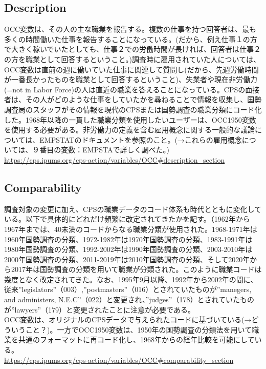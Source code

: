 \documentclass{jsarticle}
\begin{document}
\subsection{Description}
OCC変数は、その人の主な職業を報告する。複数の仕事を持つ回答者は、最も多くの時間働いた仕事を報告することになっている。(だから、例え仕事１の方で大きく稼いでいたとしても、仕事２での労働時間が長ければ、回答者は仕事２の方を職業として回答するということ。)調査時に雇用されていた人については、OCC変数は直前の週に働いていた仕事に関連して質問し(だから、先週労働時間が一番長かったものを職業として回答するということ)、失業者や現在非労働力(=not in Labor Force)の人は直近の職業を答えることになっている。CPSの面接者は、その人がどのような仕事をしていたかを尋ねることで情報を収集し、国勢調査局のスタッフがその情報を現代のCPSまたは国勢調査の職業分類にコード化した。1968年以降の一貫した職業分類を使用したいユーザーは、OCC1950変数を使用する必要がある。非労働力の定義を含む雇用概念に関する一般的な議論については、EMPSTATのドキュメントを参照のこと。(→これらの雇用概念については、９番目の変数：EMPSTAで詳しく調べた。)\\
\url{https://cps.ipums.org/cps-action/variables/OCC#description_section}

\subsection{Comparability}
調査対象の変更に加え、CPSの職業データのコード体系も時代とともに変化している。以下で具体的にどれだけ頻繁に改定されてきたかを記す。（1962年から1967年までは、40未満のコードからなる職業分類が使用された。1968-1971年は1960年国勢調査の分類、1972-1982年は1970年国勢調査の分類、1983-1991年は1980年国勢調査の分類、1992-2002年は1990年国勢調査の分類、2003-2010年は2000年国勢調査の分類、2011-2019年は2010年国勢調査の分類、そして2020年から2017年は国勢調査の分類を用いて職業が分類された。このように職業コードは幾度となく改定されてきた。なお、1995年9月以降、1992年から2002年の間に、従来”legislators”（003）,”postmasters”（016）とされていたものが”manegers, and administers, N.E.C”（022）と変更され、”judges”（178）とされていたものが”lawyers”（179）と変更されたことに注意が必要である。\\
  
OCC変数は、オリジナルのCPSデータで与えられたコードに基づいている(→どういうこと？)。一方でOCC1950変数は、1950年の国勢調査の分類法を用いて職業を共通のフォーマットに再コード化し、1968年からの経年比較を可能にしている。\\
\url{https://cps.ipums.org/cps-action/variables/OCC#comparability_section}
\end{document}
